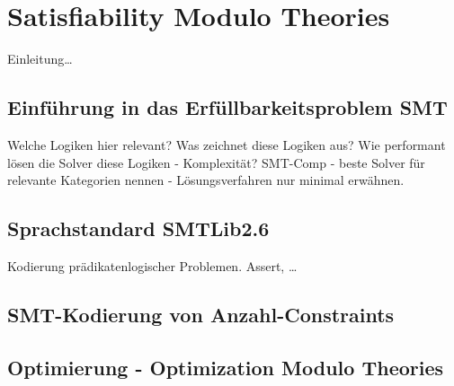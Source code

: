 \chapter{Satisfiability Modulo Theories}
\label{chapter:smt}

Einleitung\ldots

\section{Einführung in das Erfüllbarkeitsproblem SMT}
Welche Logiken hier relevant?
Was zeichnet diese Logiken aus?
Wie performant lösen die Solver diese Logiken - Komplexität?
SMT-Comp - beste Solver für relevante Kategorien nennen - Lösungsverfahren nur minimal erwähnen.

\section{Sprachstandard SMTLib2.6}
Kodierung prädikatenlogischer Problemen.
Assert, \ldots

\section{SMT-Kodierung von Anzahl-Constraints}

\section{Optimierung - Optimization Modulo Theories}
